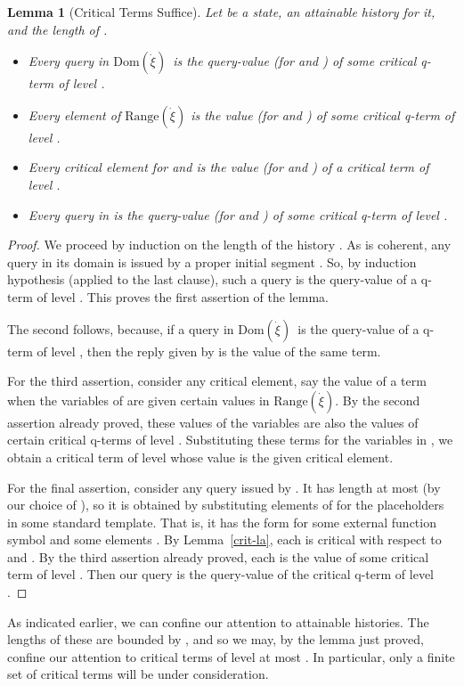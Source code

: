 \documentclass{LMCS}
\newtheorem{la}[thm]{Lemma}
\theoremstyle{definition}
\newenvironment{ls}{\begin{itemize}}{\end{itemize}}
\newcommand{\ans}{\dot}
\newcommand{\dom}[1]{\ensuremath{{\text{Dom}}(#1)}}
\newcommand{\ran}[1]{\ensuremath{{\text{Range}}(#1)}}
\begin{document}
\begin{la}[Critical Terms Suffice]  \label{tags-suff}
Let  be a state,  an attainable history for it, and  the
length of .
\begin{ls}
  \item Every query in \dom{\ans\xi}\ is the query-value (for  and ) of
some critical q-term of level .
   \item Every element of \ran{\ans\xi} is the value (for  and
   ) of some critical q-term of level .
   \item Every critical element for  and  is the value (for
    and ) of a critical term of level .
   \item Every query in  is the query-value (for  and
) of some critical q-term of level .
\end{ls}
\end{la}

\begin{proof}
We proceed by induction on the length  of the history . As
 is coherent, any query in its domain is issued by a proper
initial segment .  So, by induction hypothesis
(applied to the last clause), such a query is the query-value of a
q-term of level . This proves the
first assertion of the lemma.

The second follows, because, if a query in \dom{\ans\xi}\ is the
query-value of a q-term of level , then the reply given by
 is the value of the same term.

For the third assertion, consider any critical element, say the value
of a term  when the variables of  are given certain values
in \ran{\ans\xi}.  By the second assertion already proved, these
values of the variables are also the values of certain critical
q-terms of level . Substituting these terms for the variables
in , we obtain a critical term of level  whose value is the
given critical element.

For the final assertion, consider any query issued by .  It has
length at most  (by our choice of ), so it is obtained by
substituting elements of  for the placeholders in some standard
template.  That is, it has the form  for some
external function symbol  and some elements .  By
Lemma~\ref{crit-la}, each  is critical with respect to  and
.  By the third assertion already proved, each  is the value
of some critical term  of level .  Then our query  is the query-value of the critical q-term
 of level .
\end{proof}

As indicated earlier, we can confine our attention to attainable
histories.  The lengths of these are bounded by , and so we
may, by the lemma just proved, confine our attention to critical
terms of level at most .  In particular, only a finite set of
critical terms will be under consideration.
\end{document}
